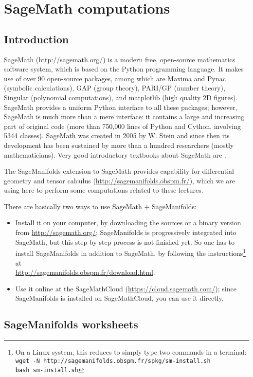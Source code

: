 \chapter{SageMath computations} \label{s:sam}

\minitoc

\section{Introduction}


\textsf{SageMath} (\url{http://sagemath.org/}) is a modern free,
open-source mathematics software system, which is
based on the Python programming language. It makes use of over 90 open-source packages,
among which are \textsf{Maxima} and \textsf{Pynac} (symbolic calculations),
\textsf{GAP} (group theory),
\textsf{PARI/GP} (number theory), \textsf{Singular} (polynomial computations),
and \textsf{matplotlib} (high quality 2D figures).
\textsf{SageMath} provides a uniform Python interface to all these packages; however,
\textsf{SageMath} is much more than a mere interface: it contains a large and increasing part of
original code (more than 750,000 lines of Python and Cython, involving 5344 classes).
\textsf{SageMath} was created in 2005 by W. Stein \cite{SteinJ05} and since
then its development has been sustained by more than a hundred researchers
(mostly mathematicians). Very good introductory textbooks about \textsf{SageMath} are
\cite{JoyneS14,Zimme13,Bard15}.

The \textsf{SageManifolds} extension to
\textsf{SageMath} provides capability for differential geometry and tensor calculus
(\url{http://sagemanifolds.obspm.fr/}), which we are using here to perform
some computations related to these lectures.

There are basically two ways to use \textsf{SageMath} + \textsf{SageManifolds}:
\begin{itemize}
\item Install it on your computer, by downloading the sources or a binary version
from \url{http://sagemath.org/}; \textsf{SageManifolds} is progressively integrated
into \textsf{SageMath}, but this step-by-step process is not finished yet. So
one has to install \textsf{SageManifolds} in addition to \textsf{SageMath}, by
following the instructions\footnote{On a Linux system, this reduces to simply type
two commands in a terminal:\\
\texttt{wget -N http://sagemanifolds.obspm.fr/spkg/sm-install.sh}\\
\texttt{bash sm-install.sh}}
at \\ \url{http://sagemanifolds.obspm.fr/download.html}.
\item Use it online at the \textsf{SageMathCloud} (\url{https://cloud.sagemath.com/});
since \textsf{SageManifolds} is installed on \textsf{SageMathCloud}, you can
use it directly.
\end{itemize}

\section{SageManifolds worksheets}
